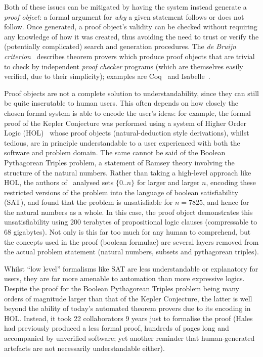 \documentclass[letterpaper]{article}
\begin{document}
Both of these issues can be mitigated by having the system instead
generate a \emph{proof object}: a formal argument for \emph{why} a
given statement follows or does not follow. Once generated, a proof
object's validity can be checked without requiring any knowledge of
how it was created, thus avoiding the need to trust or verify the
(potentially complicated) search and generation procedures. The
\emph{de Bruijn criterion}~\cite{barendregt2005challenge} describes
theorem provers which produce proof objects that are trivial to check
by independent \emph{proof checker} programs (which are themselves
easily verified, due to their simplicity); examples are
Coq~\cite{barras1997coq} and Isabelle~\cite{nipkow2002isabelle}.

Proof objects are not a complete solution to understandability, since
they can still be quite inscrutable to human users. This often depends
on how closely the chosen formal system is able to encode the user's
ideas: for example, the formal proof of the Kepler Conjecture was
performed using a system of Higher Order Logic
(HOL)~\cite{hales2015formal} whose proof objects (natural-deduction
style derivations), whilst tedious, are in principle understandable to
a user experienced with both the software and problem domain. The same
cannot be said of the Boolean Pythagorean Triples problem, a statement
of Ramsey theory involving the structure of the natural
numbers. Rather than taking a high-level approach like HOL, the
authors of~\cite{heule2016solving} analysed sets $\{0..n\}$ for larger
and larger $n$, encoding these restricted versions of the problem into
the language of boolean satisfiability (SAT), and found that the
problem is unsatisfiable for $n= 7825$, and hence for the natural
numbers as a whole. In this case, the proof object demonstrates this
unsatisfiability using 200 terabytes of propositional logic clauses
(compressable to 68 gigabytes).  Not only is this far too much for any
human to comprehend, but the concepts used in the proof (boolean
formulae) are several layers removed from the actual problem statement
(natural numbers, subsets and pythagorean triples).

Whilst ``low level'' formalisms like SAT are less understandable or
explanatory for users, they are far more amenable to automation than
more expressive logics.  Despite the proof for the Boolean Pythagorean
Triples problem being many orders of magnitude larger than that of the
Kepler Conjecture, the latter is well beyond the ability of today's
automated theorem provers due to its encoding in HOL. Instead, it took
22 collaborators 9 years just to formalise the proof (Hales had
previously produced a less formal proof, hundreds of pages long and
accompanied by unverified software; yet another reminder that
human-generated artefacts are not necessarily understandable either).
\end{document}
